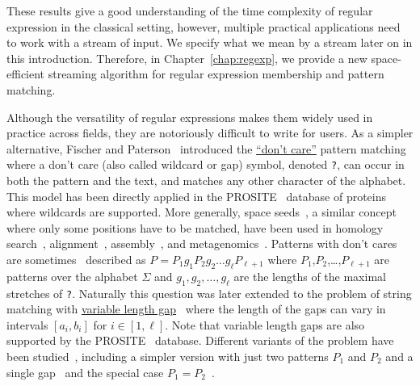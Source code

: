 These results give a good understanding of the time complexity of regular expression in the classical setting, however, multiple practical applications need to work with a stream of input. We specify what we mean by a stream later on in this introduction. Therefore, in Chapter~\ref{chap:regexp}, we provide a new space-efficient streaming algorithm for regular expression membership and pattern matching.


Although the versatility of regular expressions makes them widely used in practice across fields, they are notoriously difficult to write for users.
As a simpler alternative, Fischer and Paterson~\cite{FischerPaterson} introduced the \underline{``don't care''} pattern matching where a don't care (also called wildcard or gap) symbol, denoted \texttt{?}, can occur in both the pattern and the text, and matches any other character of the alphabet.
This model has been directly applied in the PROSITE~\cite{hulo2006prosite} database of proteins where wildcards are supported. More generally, space seeds~\cite{li2004patternhunter}, a similar concept where only some positions have to be matched, have been used in homology search~\cite{ma2002patternhunter}, alignment~\cite{david2011shrimp2}, assembly~\cite{birol2015spaced}, and metagenomics~\cite{bvrinda2015spaced}.
Patterns with don't cares are sometimes~\cite{lewenstein2011indexing} described as $P= P_1g_1P_2g_2 \dots g_\ell P_{\ell+1}$ where $P_1$,$P_2$,\dots,$P_{\ell+1}$ are patterns over the alphabet $\Sigma$ and $g_1,g_2,\dots,g_{\ell}$ are the lengths of the maximal stretches of \texttt{?}. 
Naturally this question was later extended to the problem of string matching with \underline{variable length gap}~\cite{bille2012string,bille2014string} where the length of the gaps can vary in intervals $[a_i,b_i]$ for $i\in[1,\ell]$.
Note that variable length gaps are also supported by the PROSITE~\cite{hulo2006prosite} database.
Different variants of the problem have been studied~\cite{kopelowitz2016color,cohen2009range,brodal1999finding}, including a simpler version with just two patterns $P_1$ and $P_2$ and a single gap~\cite{peterlongo2006gapped,iliopoulos2009indexing} and the special case $P_1=P_2$~\cite{muthukrishnan2002efficient,keller2007range}.

